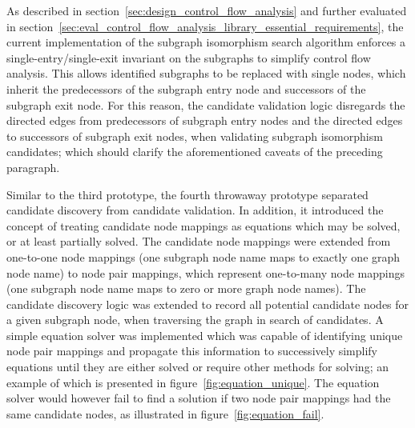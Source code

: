 As described in section~\ref{sec:design_control_flow_analysis} and further evaluated in section~\ref{sec:eval_control_flow_analysis_library_essential_requirements}, the current implementation of the subgraph isomorphism search algorithm enforces a single-entry/single-exit invariant on the subgraphs to simplify control flow analysis. This allows identified subgraphs to be replaced with single nodes, which inherit the predecessors of the subgraph entry node and successors of the subgraph exit node. For this reason, the candidate validation logic disregards the directed edges from predecessors of subgraph entry nodes and the directed edges to successors of subgraph exit nodes, when validating subgraph isomorphism candidates; which should clarify the aforementioned caveats of the preceding paragraph.

Similar to the third prototype, the fourth throwaway prototype separated candidate discovery from candidate validation. In addition, it introduced the concept of treating candidate node mappings as equations which may be solved, or at least partially solved. The candidate node mappings were extended from one-to-one node mappings (one subgraph node name maps to exactly one graph node name) to node pair mappings, which represent one-to-many node mappings (one subgraph node name maps to zero or more graph node names). The candidate discovery logic was extended to record all potential candidate nodes for a given subgraph node, when traversing the graph in search of candidates. A simple equation solver was implemented which was capable of identifying unique node pair mappings and propagate this information to successively simplify equations until they are either solved or require other methods for solving; an example of which is presented in figure~\ref{fig:equation_unique}. The equation solver would however fail to find a solution if two node pair mappings had the same candidate nodes, as illustrated in figure~\ref{fig:equation_fail}.

